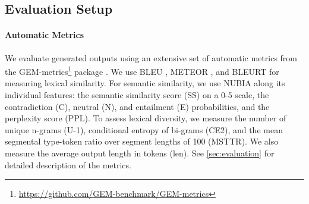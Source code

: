 \subsection{Evaluation Setup}
\paragraph{Automatic Metrics}
We evaluate generated outputs using an extensive set of automatic metrics from the GEM-metrics\footnote{\url{https://github.com/GEM-benchmark/GEM-metrics}} package \cite{gehrmannGEMBenchmarkNatural2021}. We use BLEU \cite{papineni2002bleu}, \mbox{METEOR} \cite{banerjee-lavie-2005-meteor}, and BLEURT \cite{sellam2020bleurt} for measuring lexical similarity. For semantic similarity, we use NUBIA \cite{kaneNUBIANeUralBased2020} along its individual features: the semantic similarity score (SS) on a 0-5 scale, the contradiction (C), neutral (N), and entailment (E) probabilities, and the perplexity score (PPL). To assess lexical diversity, we measure the number of unique n-grams (U-1), conditional entropy of bi-grams (CE2), and the mean segmental type-token ratio over segment lengths of 100 (MSTTR). We also measure the average output length in tokens (len). See \autoref{sec:evaluation} for detailed description of the metrics.

